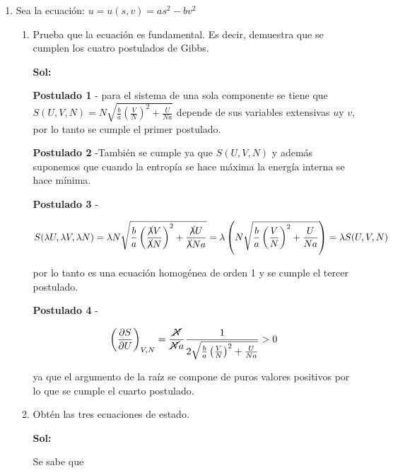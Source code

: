 \documentclass[12pt,a4paper]{article}
\begin{document}
\begin{enumerate}
    
    

    



\item Sea la ecuación: $u = u(s,v)= as^2 - bv^2$

\begin{enumerate}
    \item Prueba que la ecuación es fundamental. Es decir, demuestra que se cumplen los cuatro postulados de Gibbs.
    
    \textbf{Sol:}
    
    \textbf{Postulado 1} - para el sistema de una sola componente se tiene que $S(U,V,N)=N \sqrt{\frac{b}{a}\left(\frac{V}{N}\right)^2 + \frac{U}{Na}}$ depende de sus variables extensivas $u$y $v$, por lo tanto se cumple el primer postulado.
    
    \textbf{Postulado 2} -También se cumple ya que $S(U,V,N)$ y además suponemos que cuando la entropía se hace máxima la energía interna se hace mínima.
    
    \textbf{Postulado 3} -
    
    \begin{equation*}
        S(\lambda U, \lambda V, \lambda N) = \lambda N \sqrt{\frac{b}{a}\left(\frac{\cancel{\lambda} V}{\cancel{\lambda} N}\right)^2 + \frac{\cancel{\lambda} U}{\cancel{\lambda} N a}} = \lambda\left( N \sqrt{\frac{b}{a}\left(\frac{ V}{ N}\right)^2 + \frac{ U}{ N a}}\right) = \lambda S(U,V,N)
    \end{equation*}
    
    por lo tanto es una ecuación homogénea de orden 1 y se cumple el tercer postulado.
    
    \textbf{Postulado 4} -
    
    \begin{equation*}
        \left(\frac{\partial S}{\partial U}\right)_{V,N} =\frac{\cancel{N}}{\cancel{N}a} \frac{1}{2\sqrt{\frac{b}{a}\left(\frac{V}{N}\right)^2 + \frac{U}{Na}}} > 0
    \end{equation*}
    
    ya que el argumento de la raíz se compone de puros valores positivos por lo que se cumple el cuarto postulado.
    
    \item Obtén las tres ecuaciones de estado.
    
    \textbf{Sol:}
    
    Se sabe que
    

\end{enumerate}
\end{enumerate}
\end{document}
